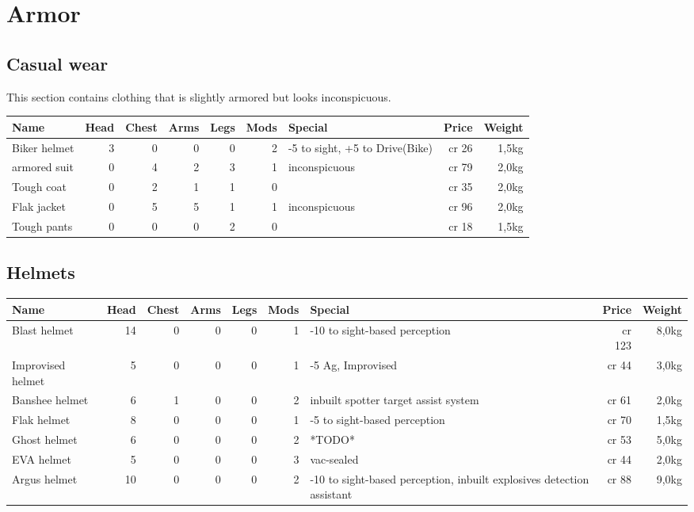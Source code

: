 \documentclass[12pt,a4paper,openany]{book}
\begin{document}
	\section{Armor}
	\subsection{Casual wear}
	This section contains clothing that is slightly armored but looks inconspicuous.\\ %
	\begin{tabularx}{\textwidth}{|l|r|r|r|r|r|l|r|r|}
		\hline
		Name & Head & Chest & Arms & Legs & Mods & Special & Price & Weight \\ \hline
		Biker helmet & 3 & 0 & 0 & 0 & 2 & -5 to sight, +5 to Drive(Bike) & cr 26 & 1,5kg \\ \hline
		armored suit & 0 & 4 & 2 & 3 & 1 & inconspicuous & cr 79 & 2,0kg \\ \hline
		Tough coat & 0 & 2 & 1 & 1 & 0 & & cr 35 & 2,0kg \\ \hline
		Flak jacket & 0 & 5 & 5 & 1 & 1 & inconspicuous & cr 96 & 2,0kg \\ \hline
		Tough pants & 0 & 0 & 0 & 2 & 0 & & cr 18 & 1,5kg \\ \hline
	\end{tabularx}
	\subsection{Helmets}
	\begin{tabularx}{\textwidth}{|l|r|r|r|r|r|l|r|r|}
		\hline
		Name & Head & Chest & Arms & Legs & Mods & Special & Price & Weight \\ \hline
		Blast helmet & 14 & 0 & 0 & 0 & 1 & -10 to sight-based perception & cr 123 & 8,0kg \\ \hline
		Improvised helmet & 5 & 0 & 0 & 0 & 1 & -5 Ag, Improvised & cr 44 & 3,0kg \\ \hline
		Banshee helmet & 6 & 1 & 0 & 0 & 2 & inbuilt spotter target assist system & cr 61 & 2,0kg \\ \hline
		Flak helmet & 8 & 0 & 0 & 0 & 1 & -5 to sight-based perception & cr 70 & 1,5kg \\ \hline
		Ghost helmet & 6 & 0 & 0 & 0 & 2 & *TODO* & cr 53 & 5,0kg \\ \hline
		EVA helmet & 5 & 0 & 0 & 0 & 3 & vac-sealed & cr 44 & 2,0kg \\ \hline
		Argus helmet & 10 & 0 & 0 & 0 & 2 & -10 to sight-based perception, inbuilt explosives detection assistant & cr 88 & 9,0kg \\ \hline
	\end{tabularx}
\end{document}
